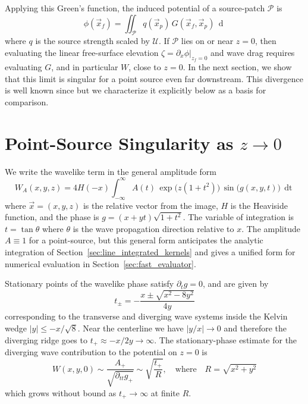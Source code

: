 \documentclass[]{JFM-FLM_Au}
\newcommand{\di}[1]{\mathop{\mathrm{d}#1}} %
\begin{document}
Applying this Green's function, the induced potential of a source-patch $\mathcal{P}$ is
\begin{equation}\label{eq:patch}
\phi(\vec x_f) = \iint_{\mathcal{P}} q(\vec x_p)\,G(\vec x_f,\vec x_p)\,\di{a_p}
\end{equation}
where $q$ is the source strength scaled by $\mathscr{U}$. If $\mathcal{P}$ lies on or near $z=0$, then evaluating the linear free-surface elevation $\zeta = \partial_x\phi|_{z_f=0}$ and wave drag requires evaluating $G$, and in particular $W$, close to $z=0$. In the next section, we show that this limit is singular for a point source even far downstream. This divergence is well known since \cite{ursell_kelvins_1960} but we characterize it explicitly below as a basis for comparison.

\section{Point-Source Singularity as $z\to 0$}\label{sec:point_source_asymptotics}

We write the wavelike term in the general amplitude form
\begin{equation}\label{eq:wavelike_general}
W_A(x,y,z) = 4H(-x)\int_{-\infty}^{\infty} A(t)\,\exp\bigl(z(1+t^2)\bigr)\,\sin\bigl(g(x,y,t)\bigr)\,\di t
\end{equation}
where $\vec x=(x,y,z)$ is the relative vector from the image, $H$ is the Heaviside function, and the phase is $g = (x+yt)\sqrt{1+t^2}$. The variable of integration is $t=\tan\theta$ where $\theta$ is the wave propagation direction relative to $x$. The amplitude $A\equiv 1$ for a point-source, but this general form anticipates the analytic integration of Section~\ref{sec:line_integrated_kernels} and gives a unified form for numerical evaluation in Section~\ref{sec:fast_evaluator}.  

Stationary points of the wavelike phase satisfy $\partial_t g = 0$, and are given by
\begin{equation}\label{eq:sp}
t_\pm = -\frac{x \pm \sqrt{x^2 - 8y^2}}{4y}
\end{equation}
corresponding to the transverse and diverging wave systems inside the Kelvin wedge $|y| \le -x /\sqrt{8}$. Near the centerline we have $|y/x|\to 0$ and therefore the diverging ridge goes to $t_+ \approx -x/2y \to \infty$. The stationary-phase estimate for the diverging wave contribution to the potential on $z=0$ is
\[
W(x,y,0) \sim \frac{A_+}{\sqrt{\partial_{tt}g_+}}\sim \sqrt{\frac{t_+}{R}},\quad\text{where}\quad R = \sqrt{x^2+y^2}
\]
which grows without bound as $t_+\to\infty$ at finite $R$.
\end{document}
